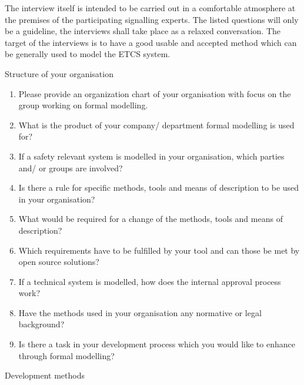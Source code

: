 \documentclass{./template/openetcs2}
\begin{document}
The interview itself is intended to be carried out in a comfortable atmosphere at the premises of the participating signalling experts. The listed questions will only be a guideline, the interviews shall take place as a relaxed conversation. The target of the interviews is to have a good usable and accepted method which can be generally used to model the ETCS system.\newpage

 
{\begin{enumerate}


	\renewcommand{\theenumi}{\Alph{enumi}}
	\renewcommand{\labelenumi}{\theenumi}

	\renewcommand{\theenumii}{\arabic{enumii}}
	\renewcommand{\labelenumii}{\theenumii}

      {\Large \item Structure of your organisation}

	\begin{enumerate}

	
    	  \item Please provide an organization chart of your organisation with focus on the group working on formal modelling.
    	  \item What is the product of your company/ department formal modelling is used for?
 	  \item If a safety relevant system is modelled in your organisation, which parties and/ or groups are involved?
              \item Is there a rule for specific methods, tools and means of description to be used in your organisation?
  	  \item What would be required for a change of the methods, tools and means of description?
	  \item Which requirements have to be fulfilled by your tool and can those be met by open source solutions?
   	  \item If a technical system is modelled, how does the internal approval process work?
    	  \item Have the methods used in your organisation any normative or legal background?
    	  \item Is there a task in your development process which you would like to enhance through formal modelling?
	\end{enumerate}


     {\Large \item  Development methods}
	

	\begin{enumerate}


\end{enumerate}
\end{enumerate}}
\end{document}
